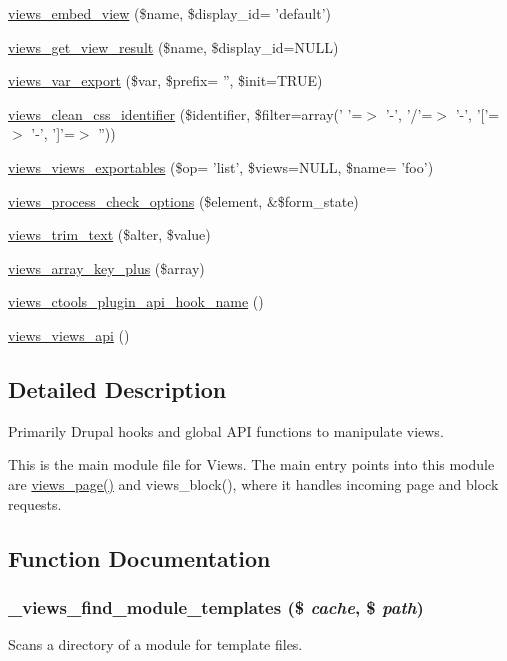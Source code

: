 \begin{DoxyCompactItemize}
\item 
\hyperlink{views_8module_ae8f9f0c72da6982461ec2423eaf88a5a}{views\_\-embed\_\-view} (\$name, \$display\_\-id= 'default')
\item 
\hyperlink{views_8module_a176654fda08f5f0fcb5c8d5e41de5078}{views\_\-get\_\-view\_\-result} (\$name, \$display\_\-id=NULL)
\item 
\hyperlink{views_8module_af1114513b82cdc5613adc9dee41e11c7}{views\_\-var\_\-export} (\$var, \$prefix= '', \$init=TRUE)
\item 
\hyperlink{views_8module_ab664f954156e8a19e30b4db39812fad6}{views\_\-clean\_\-css\_\-identifier} (\$identifier, \$filter=array(' '=$>$ '-\/', '/'=$>$ '-\/', '\mbox{[}'=$>$ '-\/', '\mbox{]}'=$>$ ''))
\item 
\hyperlink{views_8module_a132f41fd30b74a1be5592fd178ccdd85}{views\_\-views\_\-exportables} (\$op= 'list', \$views=NULL, \$name= 'foo')
\item 
\hyperlink{views_8module_a15e88bdb192b9928200f4304f010acb1}{views\_\-process\_\-check\_\-options} (\$element, \&\$form\_\-state)
\item 
\hyperlink{views_8module_aa312b055f6206c4ba0c088e60d339d9f}{views\_\-trim\_\-text} (\$alter, \$value)
\item 
\hyperlink{views_8module_ab67b484fcc0a053477538cab840645c0}{views\_\-array\_\-key\_\-plus} (\$array)
\item 
\hyperlink{views_8module_abd5c327faf0b930512aaa7442a778504}{views\_\-ctools\_\-plugin\_\-api\_\-hook\_\-name} ()
\item 
\hyperlink{views_8module_a907c76d0314986d60f7e2361243eaa5d}{views\_\-views\_\-api} ()
\end{DoxyCompactItemize}


\subsection{Detailed Description}
Primarily Drupal hooks and global API functions to manipulate views.

This is the main module file for Views. The main entry points into this module are \hyperlink{views_8module_a1cbb11f8adc6fbfecb3a029ab2973cff}{views\_\-page()} and views\_\-block(), where it handles incoming page and block requests. 

\subsection{Function Documentation}
\hypertarget{views_8module_a80aabc6f7846ad34568192eec17b70d7}{
\subsubsection[{\_\-views\_\-find\_\-module\_\-templates}]{\setlength{\rightskip}{0pt plus 5cm}\_\-views\_\-find\_\-module\_\-templates (\$ {\em cache}, \/  \$ {\em path})}}
\label{views_8module_a80aabc6f7846ad34568192eec17b70d7}
Scans a directory of a module for template files.


